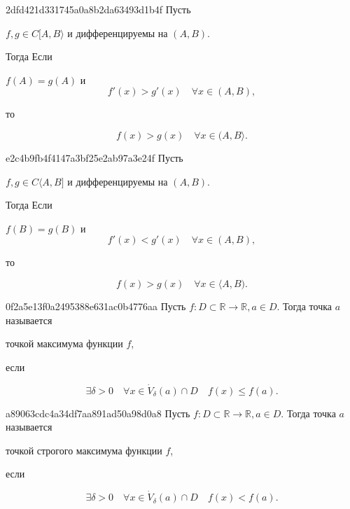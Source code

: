 \begin{note}{2dfd421d331745a0a8b2da63493d1b4f}
    Пусть \begin{icloze}{3}\( f, g \in C[A, B\rangle \) и дифференцируемы на \( (A,  B) \).\end{icloze} Тогда
    Если \begin{icloze}{2}\( f(A) = g(A) \) и
        \[
            f'(x) > g'(x) \quad \forall x \in (A, B),
        \]
    \end{icloze}    то
    \begin{icloze}{1}\[
        f(x) > g(x) \quad \forall x \in (A, B\rangle.
    \]\end{icloze}
\end{note}

\begin{note}{e2c4b9fb4f4147a3bf25e2ab97a3e24f}
    Пусть \begin{icloze}{3}\( f, g \in C \langle A, B] \) и дифференцируемы на \( (A,  B) \).\end{icloze} Тогда
    Если \begin{icloze}{2}\( f(B) = g(B) \) и
        \[
            f'(x) < g'(x) \quad \forall x \in (A, B),
        \]
    \end{icloze}    то
    \begin{icloze}{1}\[
        f(x) > g(x) \quad \forall x \in \langle A, B).
    \]\end{icloze}
\end{note}

\begin{note}{0f2a5e13f0a2495388e631ac0b4776aa}
    Пусть \( f : D \subset \mathbb R \to \mathbb R, a \in D \). Тогда точка \( a \) называется \begin{icloze}{2}точкой максимума функции \( f \),\end{icloze} если
    \begin{icloze}{1}\[
                         \exists \delta > 0 \quad \forall x \in \dot V_{\delta} (a) \cap D \quad f(x) \leqslant f(a).
                     \]\end{icloze}
\end{note}

\begin{note}{a89063cdc4a34df7aa891ad50a98d0a8}
    Пусть \( f : D \subset \mathbb R \to \mathbb R, a \in D \). Тогда точка \( a \) называется \begin{icloze}{2}точкой строгого максимума функции \( f \),\end{icloze} если
    \begin{icloze}{1}\[
        \exists \delta > 0 \quad \forall x \in \dot V_{\delta} (a) \cap D \quad f(x) < f(a).
    \]\end{icloze}
\end{note}

